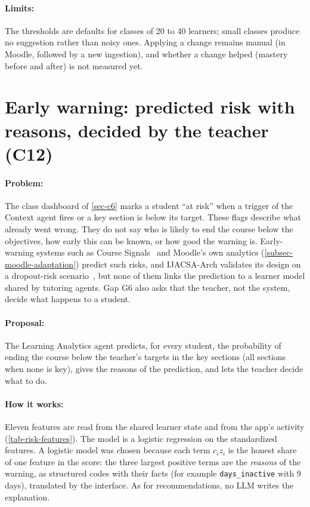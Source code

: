 \paragraph{Limits:} The thresholds are defaults for classes of 20 to 40
learners; small classes produce no suggestion rather than noisy ones.
Applying a change remains manual (in Moodle, followed by a new
ingestion), and whether a change helped (mastery before and after) is
not measured yet.

\section[Early warning]{Early warning: predicted risk with reasons, decided by the teacher (C12)}
\label{sec-c12}

\paragraph{Problem:} The class dashboard of \cref{sec-c6} marks a student
``at risk'' when a trigger of the Context agent fires or a key section is
below its target. These flags describe what already went wrong. They do
not say who is likely to end the course below the objectives, how early
this can be known, or how good the warning is. Early-warning systems such
as Course Signals~\cite{arnold2012} and Moodle's own analytics
(\cref{subsec-moodle-adaptation}) predict such risks, and IJACSA-Arch
validates its design on a dropout-risk scenario~\cite{khaddar2026ijacsa},
but none of them links the prediction to a learner model shared by
tutoring agents. Gap G6 also asks that the teacher, not the system,
decide what happens to a student.

\paragraph{Proposal:} The Learning Analytics agent predicts, for every
student, the probability of ending the course below the teacher's
targets in the key sections (all sections when none is key), gives the
reasons of the prediction, and lets the teacher decide what to do.

\paragraph{How it works:} Eleven features are read from the shared
learner state and from the app's activity
(\cref{tab-risk-features}). The model is a logistic regression on the
standardized features. A logistic model was chosen because each term
$c_i z_i$ is the honest share of one feature in the score: the three
largest positive terms are the \emph{reasons} of the warning, as
structured codes with their facts (for example \texttt{days\_inactive}
with 9 days), translated by the interface. As for recommendations, no LLM
writes the explanation.

